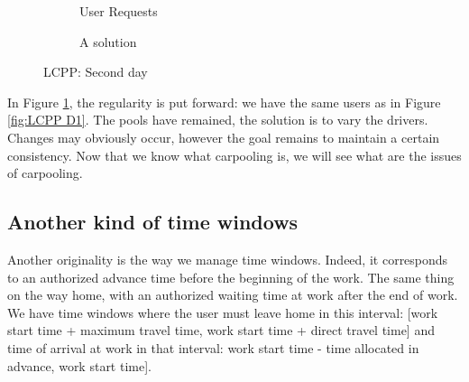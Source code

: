 \documentclass[12pt, a4paper, twoside]{memoir}
\newcommand{\newpar}{\vskip 0.2in \noindent}
\begin{document}
{	\begin{figure}[H]
		\centering
		\begin{subfigure}{.5\textwidth}
			\centering
			\caption{User Requests}
		\end{subfigure}%
		\begin{subfigure}{.5\textwidth}
			\centering
			\caption{A solution}
		\end{subfigure}
		\caption{LCPP: Second day}
		\label{fig:LCPP D2}
	\end{figure}
	
	In Figure \ref{fig:LCPP D2}, the regularity is put forward: we have the same users as in Figure \ref{fig:LCPP D1}. The pools have remained, the solution is to vary the drivers. Changes may obviously occur, however the goal remains to maintain a certain consistency.
	\newpar
	Now that we know what carpooling is, we will see what are the issues of carpooling. 

	\subsection*{Another kind of time windows}
	
	Another originality is the way we manage time windows. Indeed, it corresponds to an authorized advance time before the beginning of the work. The same thing on the way home, with an authorized waiting time at work after the end of work. \newline
	We have time windows where the user must leave home in this interval: \newline
	{[work start time + maximum travel time, work start time + direct travel time]} \newline
	and time of arrival at work in that interval: \newline
	{work start time - time allocated in advance, work start time]}.
	
}
\end{document}
